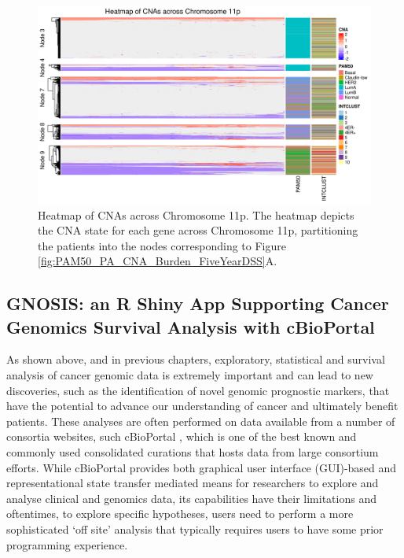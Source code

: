 \vfill 

\begin{figure}[H]
  \centering
  \includegraphics[width=1\textwidth]{../figures/Chapter_3/PA_PartyKit_Survival_Burden_FiveYearDSS_PAM50.png_11p_All_Heatmap.png}
  \caption[Heatmap of CNAs across Chromosome 11p]{Heatmap of CNAs across Chromosome 11p. The heatmap depicts the CNA state for each gene across Chromosome 11p, partitioning the patients into the nodes corresponding to Figure \ref{fig:PAM50_PA_CNA_Burden_FiveYearDSS}A.}
  \label{PA_SurvTrees_Burden_Heatmaps_11p}
\end{figure}

\subsection{GNOSIS: an R Shiny App Supporting Cancer Genomics Survival Analysis with cBioPortal}
As shown above, and in previous chapters, exploratory, statistical and survival analysis of cancer genomic data is extremely important and can lead to new discoveries, such as the identification of novel genomic prognostic markers, that have the potential to advance our understanding of cancer and ultimately benefit patients. These analyses are often performed on data available from a number of consortia websites, such cBioPortal \citep{pmid22588877, pmid23550210}, which is one of the best known and commonly used consolidated curations that hosts data from large consortium efforts. While cBioPortal provides both graphical user interface (GUI)-based and representational state transfer mediated means for researchers to explore and analyse clinical and genomics data, its capabilities have their limitations and oftentimes, to explore specific hypotheses, users need to perform a more sophisticated ‘off site’ analysis that typically requires users to have some prior programming experience. 

